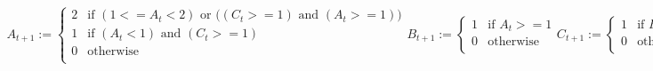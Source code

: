 \begin{center}




$
\begin{array}{l}

A_{t+1} :=\left\{ \begin{array}{cl}
      2 & \mbox{if $(1 <= A_t < 2)$ or $((C_t >= 1)$ and $(A_t >= 1))$} \\
      1 & \mbox{if $(A_t < 1)$ and $(C_t >= 1)$} \\
      0 & \mbox{otherwise}  \\
     \end{array}
\right.
B_{t+1} :=\left\{ \begin{array}{cl}
      1 & \mbox{if $A_t >= 1$} \\
      0 & \mbox{otherwise}  \\
     \end{array}
\right.
C_{t+1} :=\left\{ \begin{array}{cl}
      1 & \mbox{if $B_t >= 1$} \\
      0 & \mbox{otherwise}  \\
     \end{array}
\right.
\end{array}
$

\end{center}

